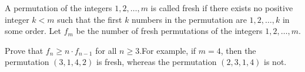 A permutation of the integers $1, 2, \ldots, m$ is called fresh if there exists no positive integer $k < m$ such that the first $k$ numbers in the permutation are $1, 2, \ldots, k$ in some order.  Let $f_m$ be the number of fresh permutations of the integers $1, 2, \ldots, m$.

Prove that $f_n \ge n \cdot f_{n - 1}$ for all $n \ge 3$.For example, if $m = 4$,  then the permutation $(3, 1, 4, 2)$ is fresh, whereas the permutation $(2, 3, 1, 4)$ is not.